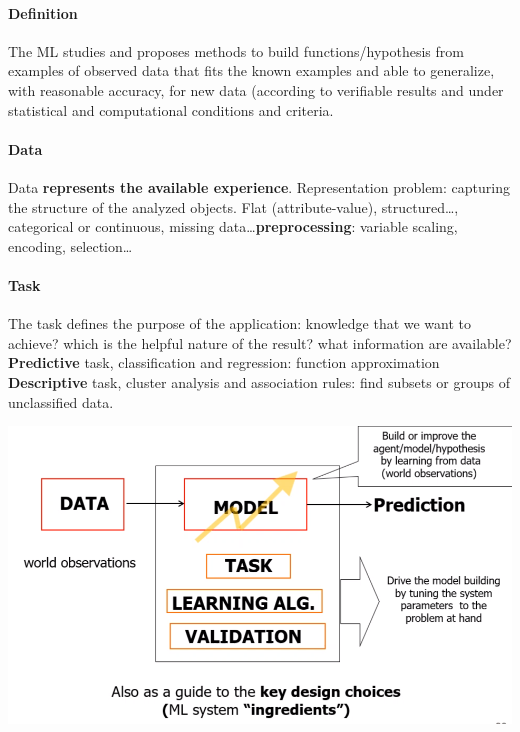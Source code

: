 \documentclass[10pt]{report}
\begin{document}
\paragraph{Definition} The ML studies and proposes methods to build functions/hypothesis from examples of observed data that fits the known examples and able to generalize, with reasonable accuracy, for new data (according to verifiable results and under statistical and computational conditions and criteria.
\paragraph{Data} Data \textbf{represents the available experience}. Representation problem: capturing the structure of the analyzed objects. Flat (attribute-value), structured\ldots, categorical or continuous, missing data\ldots \textbf{preprocessing}: variable scaling, encoding, selection\ldots
\paragraph{Task} The task defines the purpose of the application: knowledge that we want to achieve? which is the helpful nature of the result? what information are available?\\
\textbf{Predictive} task, classification and regression: function approximation\\
\textbf{Descriptive} task, cluster analysis and association rules: find subsets or groups of unclassified data.
\begin{center}
	\includegraphics[scale=0.5]{1.png}
\end{center}
\end{document}
